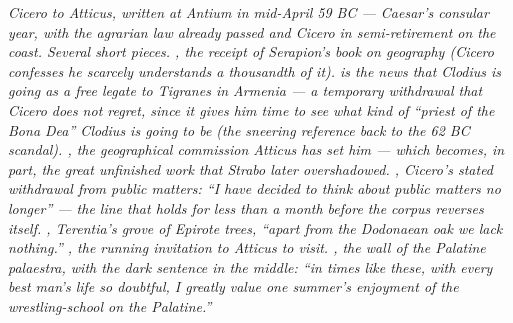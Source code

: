 
\textit{Cicero to Atticus, written at Antium in mid-April
59 BC --- Caesar's consular year, with the agrarian law
already passed and Cicero in semi-retirement on the coast.
Several short pieces. , the receipt of
Serapion's book on geography (Cicero confesses he scarcely
understands a thousandth of it).  is the
news that Clodius is going as a free legate to Tigranes
in Armenia --- a temporary withdrawal that Cicero does
not regret, since it gives him time to see what kind of
``priest of the Bona Dea'' Clodius is going to be (the
sneering reference back to the 62 BC scandal). ,
the geographical commission Atticus has set him --- which
becomes, in part, the great unfinished work that Strabo
later overshadowed. , Cicero's stated
withdrawal from public matters: ``I have decided to
think about public matters no longer'' --- the line that
holds for less than a month before the corpus reverses
itself. , Terentia's grove of Epirote
trees, ``apart from the Dodonaean oak we lack nothing.''
, the running invitation to Atticus to
visit. , the wall of the Palatine
\textit{palaestra}, with the dark sentence in the middle:
``in times like these, with every best man's life so
doubtful, I greatly value one summer's enjoyment of the
wrestling-school on the Palatine.''}
